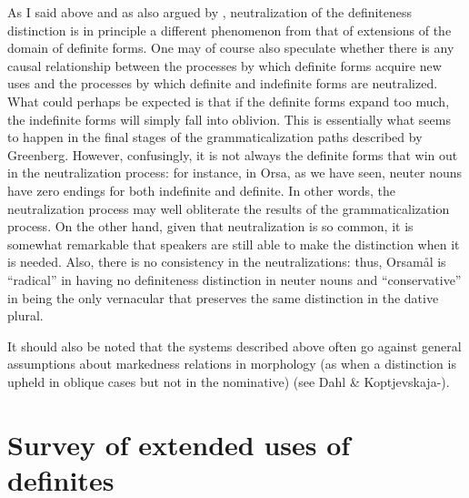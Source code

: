 \begin{styleBodytextC}
As I said above and as also argued by \citet{Hummelstedt1934}, neutralization of the definiteness distinction is in principle a different phenomenon from that of extensions of the domain of definite forms. One may of course also speculate whether there is any causal relationship between the processes by which definite forms acquire new uses and the processes by which definite and indefinite forms are neutralized. What could perhaps be expected is that if the definite forms expand too much, the indefinite forms will simply fall into oblivion. This is essentially what seems to happen in the final stages of the grammaticalization paths described by Greenberg. However, confusingly, it is not always the definite forms that win out in the neutralization process: for instance, in Orsa, as we have seen, neuter nouns have zero endings for both indefinite and definite. In other words, the neutralization process may well obliterate the results of the grammaticalization process. On the other hand, given that neutralization is so common, it is somewhat remarkable that speakers are still able to make the distinction when it is needed. Also, there is no consistency in the neutralizations: thus, Orsamål is “radical” in having no definiteness distinction in neuter nouns and “conservative” in being the only vernacular that preserves the same distinction in the dative plural.

\end{styleBodytextC}

\begin{styleBodytextC}
It should also be noted that the systems described above often go against general assumptions about markedness relations in morphology (as when a distinction is upheld in oblique cases but not in the nominative) (see Dahl \& Koptjevskaja-\citet{Tamm2006}).

\end{styleBodytextC}

\section{Survey of extended uses of definites}
